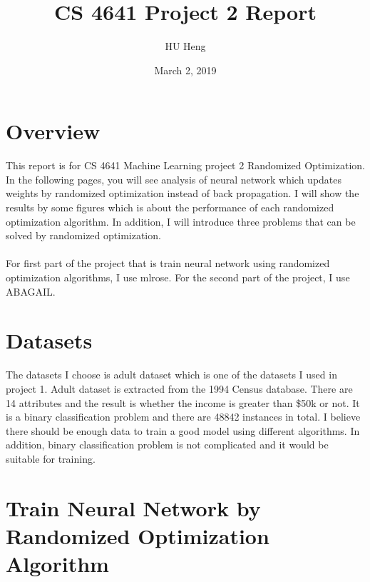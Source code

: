 \documentclass[11pt]{article}
\title{CS 4641 Project 2 Report}
\author{HU Heng}
\date{March 2, 2019}
\begin{document}
\maketitle
\section{Overview}
This report is for CS 4641 Machine Learning project 2 Randomized Optimization. In the following pages, you will see analysis of neural network which updates weights by randomized optimization instead of back propagation. I will show the results by some figures which is about the performance of each randomized optimization algorithm. In addition, I will introduce three problems that can be solved by randomized optimization. \\
\\
For first part of the project that is train neural network using randomized optimization algorithms, I use mlrose. For the second part of the project, I use ABAGAIL.

\section{Datasets}
The datasets I choose is adult dataset which is one of the datasets I used in project 1. Adult dataset is extracted from the 1994 Census database. There are 14 attributes and the result is whether the income is greater than \$50k or not. It is a binary classification problem and there are 48842 instances in total. I believe there should be enough data to train a good model using different algorithms. In addition, binary classification problem is not complicated and it would be suitable for training.

\section{Train Neural Network by Randomized Optimization Algorithm}
\end{document}
